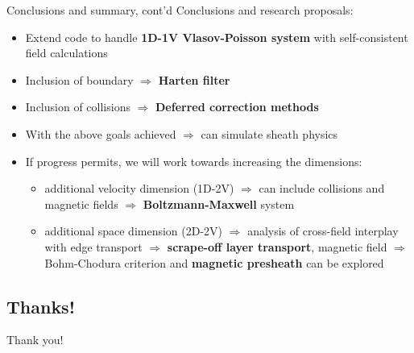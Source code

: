 \documentclass{beamer}
\begin{document}
\begin{frame}{Conclusions and summary, cont'd}
Conclusions and research proposals: 
    \begin{itemize}
    \item Extend code to handle \textbf{1D-1V Vlasov-Poisson system} with self-consistent field calculations
    \item Inclusion of boundary $\Rightarrow$ \textbf{Harten filter}
    \item Inclusion of collisions $\Rightarrow$ \textbf{Deferred correction methods}
    \item With the above goals achieved $\Rightarrow$ can simulate sheath physics
    \item If progress permits, we will work towards increasing the dimensions:
        \begin{itemize}
        \item additional velocity dimension (1D-2V)  $\Rightarrow$ can include collisions and magnetic fields $\Rightarrow$ \textbf{Boltzmann-Maxwell} system
        \item additional space dimension (2D-2V) $\Rightarrow$ analysis of cross-field interplay with edge transport $\Rightarrow$ \textbf{scrape-off layer transport},
 magnetic field $\Rightarrow$ Bohm-Chodura criterion and \textbf{magnetic presheath} can be explored
        \end{itemize}
    \end{itemize}
 \end{frame} 
  



\subsection*{Thanks!}

\begin{frame}{\subsecname}
\centering    \Huge{Thank you!}
\end{frame}
\end{document}
